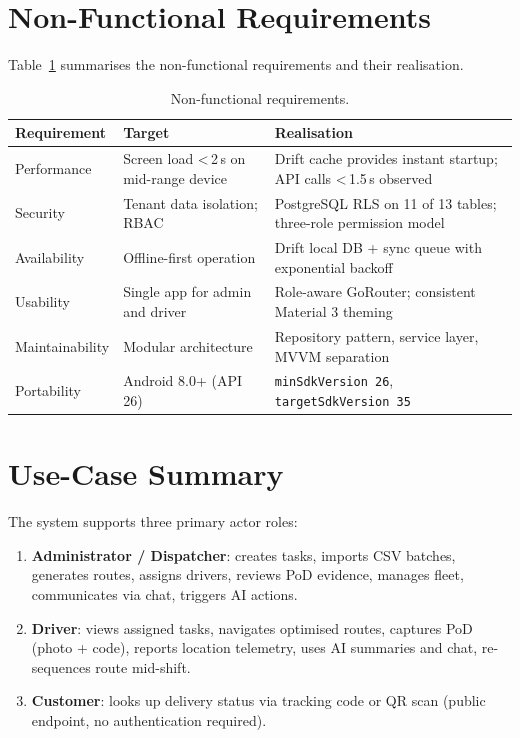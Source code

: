 \section{Non-Functional Requirements}

Table~\ref{tab:nfr} summarises the non-functional requirements and their realisation.

\begin{table}[H]
\centering
\caption{Non-functional requirements.}
\label{tab:nfr}
\begin{tabular}{@{}p{2.8cm}p{5.5cm}p{5.5cm}@{}}
\toprule
\textbf{Requirement} & \textbf{Target} & \textbf{Realisation}\\
\midrule
Performance & Screen load \textless\,2\,s on mid-range device & Drift cache provides instant startup; API calls \textless\,1.5\,s observed \\
Security & Tenant data isolation; RBAC & PostgreSQL RLS on 11 of 13 tables; three-role permission model \\
Availability & Offline-first operation & Drift local DB + sync queue with exponential backoff \\
Usability & Single app for admin and driver & Role-aware GoRouter; consistent Material 3 theming \\
Maintainability & Modular architecture & Repository pattern, service layer, MVVM separation \\
Portability & Android 8.0+ (API 26) & \texttt{minSdkVersion 26}, \texttt{targetSdkVersion 35} \\
\bottomrule
\end{tabular}
\end{table}

\section{Use-Case Summary}

The system supports three primary actor roles:

\begin{enumerate}
  \item \textbf{Administrator / Dispatcher}: creates tasks, imports CSV batches,
        generates routes, assigns drivers, reviews PoD evidence, manages fleet,
        communicates via chat, triggers AI actions.
  \item \textbf{Driver}: views assigned tasks, navigates optimised routes, captures
        PoD (photo + code), reports location telemetry, uses AI summaries and chat,
        re-sequences route mid-shift.
  \item \textbf{Customer}: looks up delivery status via tracking code or QR scan
        (public endpoint, no authentication required).
\end{enumerate}
